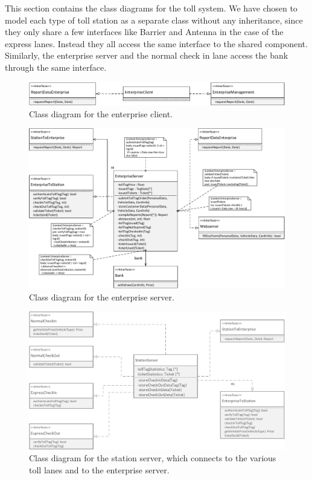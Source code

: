 This section contains the class diagrams for the toll system. We have chosen to model each type of toll station as a separate class without any inheritance, since they only share a few interfaces like Barrier and Antenna in the case of the express lanes. Instead they all access the same interface to the shared component. Similarly, the enterprise server and the normal check in lane access the bank through the same interface.

\begin{figure}[H]
\centerline{\includegraphics[width=\textwidth]{img/class_diagram/class_diagram_enterprise_client}}
\caption{Class diagram for the enterprise client.}
\label{fig:cld_ec}
\end{figure}

\begin{figure}[H]
\centerline{\includegraphics[width=\textwidth]{img/class_diagram/class_diagram_enterprise_server}}
\caption{Class diagram for the enterprise server.}
\label{fig:cld_es}
\end{figure}

\begin{figure}[H]
\centerline{\includegraphics[width=\textwidth]{img/class_diagram/class_diagram_station_server}}
\caption{Class diagram for the station server, which connects to the various toll lanes and to the enterprise server.}
\label{fig:cld_ss}
\end{figure}

